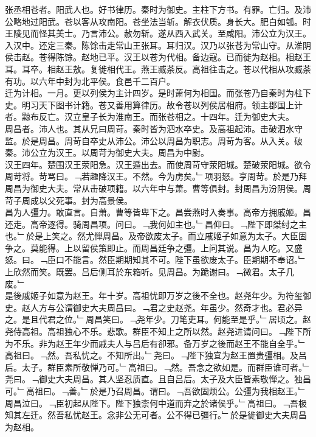 \documentclass{zhvt-classic}
\begin{document}

\hspace*{2em}张丞相苍者。阳武人也。好书律历。秦时为御史。主柱下方书。有罪。亡归。及沛公略地过阳武。苍以客从攻南阳。苍坐法当斩。解衣伏质。身长大。肥白如瓠。时王陵见而怪其美士。乃言沛公。赦勿斩。遂从西入武关。至咸阳。沛公立为汉王。入汉中。还定三秦。陈馀击走常山王张耳。耳归汉。汉乃以张苍为常山守。从淮阴侯击赵。苍得陈馀。赵地已平。汉王以苍为代相。备边寇。已而徙为赵相。相赵王耳。耳卒。相赵王敖。复徙相代王。燕王臧荼反。高祖往击之。苍以代相从攻臧荼有功。以六年中封为北平侯。食邑千二百户。\\
\hspace*{2em}迁为计相。一月。更以列侯为主计四岁。是时萧何为相国。而张苍乃自秦时为柱下史。明习天下图书计籍。苍又善用算律历。故令苍以列侯居相府。领主郡国上计者。黥布反亡。汉立皇子长为淮南王。而张苍相之。十四年。迁为御史大夫。\\
\hspace*{2em}周昌者。沛人也。其从兄曰周苛。秦时皆为泗水卒史。及高祖起沛。击破泗水守监。於是周昌。周苛自卒史从沛公。沛公以周昌为职志。周苛为客。从入关。破秦。沛公立为汉王。以周苛为御史大夫。周昌为中尉。\\
\hspace*{2em}汉王四年。楚围汉王荥阳急。汉王遁出去。而使周苛守荥阳城。楚破荥阳城。欲令周苛将。苛骂曰。﹁若趣降汉王。不然。今为虏矣。﹂项羽怒。亨周苛。於是乃拜周昌为御史大夫。常从击破项籍。以六年中与萧。曹等俱封。封周昌为汾阴侯。周苛子周成以父死事。封为高景侯。\\
\hspace*{2em}昌为人彊力。敢直言。自萧。曹等皆卑下之。昌尝燕时入奏事。高帝方拥戚姬。昌还走。高帝逐得。骑周昌项。问曰。﹁我何如主也。﹂昌仰曰。﹁陛下即桀纣之主也。﹂於是上笑之。然尤惮周昌。及帝欲废太子。而立戚姬子如意为太子。大臣固争之。莫能得。上以留侯策即止。而周昌廷争之彊。上问其说。昌为人吃。又盛怒。曰。﹁臣口不能言。然臣期期知其不可。陛下虽欲废太子。臣期期不奉诏。﹂上欣然而笑。既罢。吕后侧耳於东箱听。见周昌。为跪谢曰。﹁微君。太子几废。﹂\\
\hspace*{2em}是後戚姬子如意为赵王。年十岁。高祖忧即万岁之後不全也。赵尧年少。为符玺御史。赵人方与公谓御史大夫周昌曰。﹁君之史赵尧。年虽少。然奇才也。君必异之。是且代君之位。﹂周昌笑曰。﹁尧年少。刀笔吏耳。何能至是乎。﹂居顷之。赵尧侍高祖。高祖独心不乐。悲歌。群臣不知上之所以然。赵尧进请问曰。﹁陛下所为不乐。非为赵王年少而戚夫人与吕后有卻邪。备万岁之後而赵王不能自全乎。﹂高祖曰。﹁然。吾私忧之。不知所出。﹂尧曰。﹁陛下独宜为赵王置贵彊相。及吕后。太子。群臣素所敬惮乃可。﹂高祖曰。﹁然。吾念之欲如是。而群臣谁可者。﹂尧曰。﹁御史大夫周昌。其人坚忍质直。且自吕后。太子及大臣皆素敬惮之。独昌可。﹂高祖曰。﹁善。﹂於是乃召周昌。谓曰。﹁吾欲固烦公。公彊为我相赵王。﹂周昌泣曰。﹁臣初起从陛下。陛下独柰何中道而弃之於诸侯乎。﹂高祖曰。﹁吾极知其左迁。然吾私忧赵王。念非公无可者。公不得已彊行。﹂於是徙御史大夫周昌为赵相。\\
\end{document}
